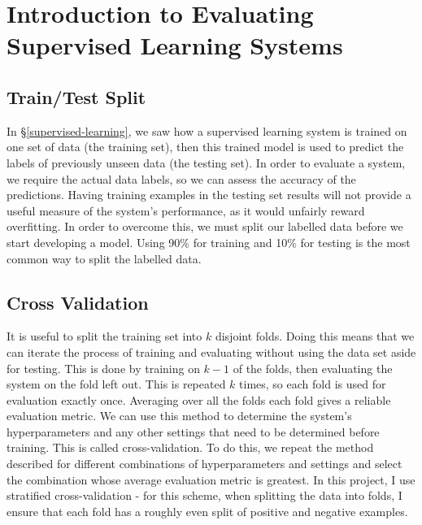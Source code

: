 \documentclass[12pt,a4paper,twoside,openright]{report}
\begin{document}
\section{Introduction to Evaluating Supervised Learning Systems} \label{prep-eval}
\subsection{Train/Test Split} \label{train-test-split}
In \S\ref{supervised-learning}, we saw how a supervised learning system is trained on one set of data (the training set), then this trained model is used to predict the labels of previously unseen data (the testing set). In order to evaluate a system, we require the actual data labels, so we can assess the accuracy of the predictions. Having training examples in the testing set results will not provide a useful measure of the system's performance, as it would unfairly reward overfitting. In order to overcome this, we must split our labelled data before we start developing a model. Using 90\% for training and 10\% for testing is the most common way to split the labelled data.
\subsection{Cross Validation} \label{cross-validation}
It is useful to split the training set into $k$ disjoint folds. Doing this means that we can iterate the process of training and evaluating without using the data set aside for testing. This is done by training on $k-1$ of the folds, then evaluating the system on the fold left out. This is repeated $k$ times, so each fold is used for evaluation exactly once. Averaging over all the folds each fold gives a reliable evaluation metric. We can use this method to determine the system's hyperparameters and any other settings that need to be determined before training. This is called cross-validation. To do this, we repeat the method described for different combinations of hyperparameters and settings and select the combination whose average evaluation metric is greatest. In this project, I use stratified cross-validation - for this scheme, when splitting the data into folds, I ensure that each fold has a roughly even split of positive and negative examples.
\end{document}
